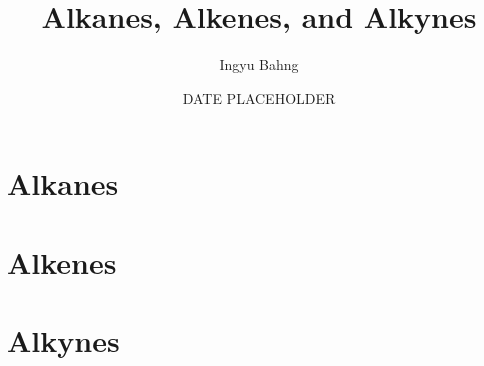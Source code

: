 \documentclass[10pt]{article}
\title{Alkanes, Alkenes, and Alkynes}
\date{DATE PLACEHOLDER}
\author{Ingyu Bahng}
\begin{document}


\section{Alkanes}

\section{Alkenes}

\section{Alkynes}
  
\end{document}
